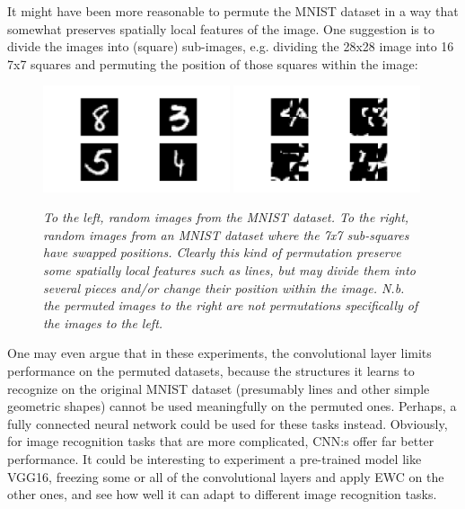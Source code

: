 \documentclass{article}
\begin{document}
            It might have been more reasonable to permute the MNIST dataset in a way 
            that somewhat preserves spatially local features of the image. One 
            suggestion is to divide the images into (square) sub-images, e.g. 
            dividing the 28x28 image into 16 7x7 squares and permuting the 
            position of those squares within the image:

            \begin{figure}[H]
                \includegraphics[width=0.49\textwidth]{figures/regular_mnist.png}
                \includegraphics[width=0.49\textwidth]{figures/shuffled_mnist.png}
                \caption{\textit{To the left, random images from the MNIST dataset. 
                To the right, random images from an MNIST dataset where the 
                7x7 sub-squares have swapped positions. Clearly this kind of 
                permutation preserve some spatially local features such as lines,
                but may divide them into several pieces and/or change their 
                position within the image. N.b. the permuted images to the right 
                are not permutations specifically of the images to the left.}}
            \end{figure}

            One may even argue that in these experiments, the convolutional 
            layer limits performance on the permuted datasets, because the 
            structures it learns to recognize on the original MNIST dataset 
            (presumably lines and other simple geometric shapes) 
            cannot be used meaningfully on the permuted ones. 
            Perhaps, a fully connected neural network could be used for these 
            tasks instead. Obviously, for image recognition tasks that are more 
            complicated, CNN:s offer far better performance. It could be interesting  
            to experiment a pre-trained model like VGG16, freezing some or all of 
            the convolutional layers and apply EWC on the other ones, and see how 
            well it can adapt to different image recognition tasks.
\end{document}
